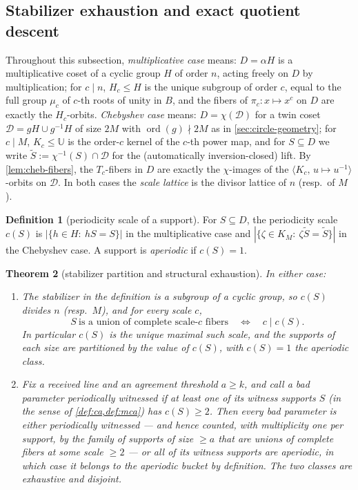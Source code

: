 \documentclass[11pt]{article}
\newtheorem{theorem}{Theorem}[section]
\theoremstyle{definition}
\newtheorem{definition}[theorem]{Definition}
\theoremstyle{remark}
\newcommand{\B}{B}
\newcommand{\UU}{\mathbb{U}}
\begin{document}
\subsection{Stabilizer exhaustion and exact quotient descent}\label{sec:discharge-T1}

Throughout this subsection, \emph{multiplicative case} means: $D=\alpha H$ is a multiplicative coset of a cyclic group $H$ of order $n$, acting freely on $D$ by multiplication; for $c\mid n$, $H_c\le H$ is the unique subgroup of order $c$, equal to the full group $\mu_c$ of $c$-th roots of unity in $\B$, and the fibers of $\pi_c:x\mapsto x^c$ on $D$ are exactly the $H_c$-orbits. \emph{Chebyshev case} means: $D=\chi(\mathcal D)$ for a twin coset $\mathcal D=gH\cup g^{-1}H$ of size $2M$ with $\operatorname{ord}(g)\nmid2M$ as in \cref{sec:circle-geometry}; for $c\mid M$, $K_c\le\UU$ is the order-$c$ kernel of the $c$-th power map, and for $S\subseteq D$ we write $\widetilde S:=\chi^{-1}(S)\cap\mathcal D$ for the (automatically inversion-closed) lift. By \cref{lem:cheb-fibers}, the $T_c$-fibers in $D$ are exactly the $\chi$-images of the $\langle K_c,\,u\mapsto u^{-1}\rangle$-orbits on $\mathcal D$. In both cases the \emph{scale lattice} is the divisor lattice of $n$ (resp.\ of $M$).

\begin{definition}[periodicity scale of a support]\label{def:periodicity-scale}
For $S\subseteq D$, the periodicity scale $c(S)$ is $|\{h\in H:\ hS=S\}|$ in the multiplicative case and $|\{\zeta\in K_M:\ \zeta\widetilde S=\widetilde S\}|$ in the Chebyshev case. A support is \emph{aperiodic} if $c(S)=1$.
\end{definition}

\begin{theorem}[stabilizer partition and structural exhaustion]\label{thm:stabilizer-partition}
In either case:
\begin{enumerate}[label=\textup{(\roman*)}]
\item The stabilizer in the definition is a subgroup of a cyclic group, so $c(S)$ divides $n$ \textup(resp.\ $M$\textup), and for every scale $c$,
\[
S\ \text{is a union of complete scale-$c$ fibers}
\quad\Longleftrightarrow\quad
c\mid c(S).
\]
In particular $c(S)$ is the unique maximal such scale, and the supports of each size are partitioned by the value of $c(S)$, with $c(S)=1$ the aperiodic class.
\item Fix a received line and an agreement threshold $a\ge k$, and call a bad parameter \emph{periodically witnessed} if at least one of its witness supports $S$ \textup(in the sense of \cref{def:ca,def:mca}\textup) has $c(S)\ge2$. Then every bad parameter is either periodically witnessed --- and hence counted, with multiplicity one per support, by the family of supports of size $\ge a$ that are unions of complete fibers at some scale $\ge2$ --- or all of its witness supports are aperiodic, in which case it belongs to the aperiodic bucket by definition. The two classes are exhaustive and disjoint.
\end{enumerate}
\end{theorem}
\end{document}
